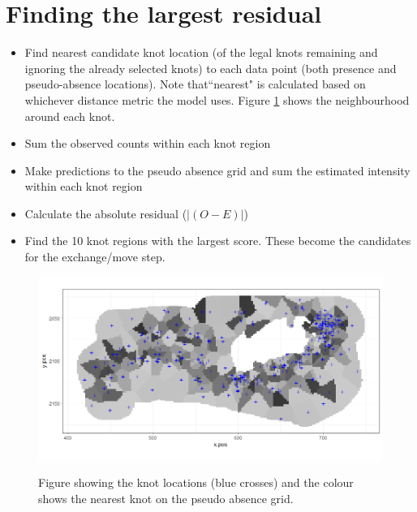 \author{
}

\maketitle %

\section{Finding the largest residual}

\begin{itemize}
    \item Find nearest candidate knot location (of the legal knots remaining and ignoring the already selected knots) to each data point (both presence and pseudo-absence locations). Note that``nearest" is calculated based on whichever distance metric the model uses. Figure \ref{fig:blocks} shows the neighbourhood around each knot.
    \item Sum the observed counts within each knot region
    \item Make predictions to the pseudo absence grid and sum the estimated intensity within each knot region
    \item Calculate the absolute residual ($|(O-E)|$)
    \item Find the 10 knot regions with the largest score.  These become the candidates for the exchange/move step.
\end{itemize}


\begin{figure}[!htb]
\centering
\caption{Figure showing the knot locations (blue crosses) and the colour shows the nearest knot on the pseudo absence grid.}
\includegraphics[width=0.9\linewidth]{suppimages/knotdatablocks}
\label{fig:blocks}
\end{figure}


